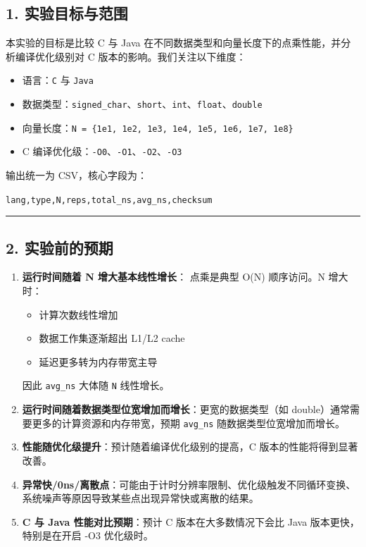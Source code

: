 \documentclass[12pt,fontset=none]{ctexart}
\providecommand{\tightlist}{%
  \setlength{\itemsep}{0pt}\setlength{\parskip}{0pt}}
\begin{document}
\subsection{1.
实验目标与范围}\label{1-ux5b9eux9a8cux76eeux6807ux4e0eux8303ux56f4}

本实验的目标是比较 C 与 Java
在不同数据类型和向量长度下的点乘性能，并分析编译优化级别对 C
版本的影响。我们关注以下维度：

\begin{itemize}
\tightlist
\item
  语言：\texttt{C} 与 \texttt{Java}
\item
  数据类型：\texttt{signed\_char}、\texttt{short}、\texttt{int}、\texttt{float}、\texttt{double}
\item
  向量长度：\texttt{N\ =\ \{1e1,\ 1e2,\ 1e3,\ 1e4,\ 1e5,\ 1e6,\ 1e7,\ 1e8\}}
\item
  C 编译优化级：\texttt{-O0}、\texttt{-O1}、\texttt{-O2}、\texttt{-O3}
\end{itemize}

输出统一为 CSV，核心字段为：

\texttt{lang,type,N,reps,total\_ns,avg\_ns,checksum}

\begin{center}\rule{0.5\linewidth}{0.5pt}\end{center}

\subsection{2.
实验前的预期}\label{2-ux5b9eux9a8cux524dux7684ux9884ux671f}

\begin{enumerate}
\def\labelenumi{\arabic{enumi}.}
\item
  \textbf{运行时间随着 N 增大基本线性增长}： 点乘是典型 O(N) 顺序访问。N
  增大时：

  \begin{itemize}
  \tightlist
  \item
    计算次数线性增加
  \item
    数据工作集逐渐超出 L1/L2 cache
  \item
    延迟更多转为内存带宽主导
  \end{itemize}

  因此 \texttt{avg\_ns} 大体随 \texttt{N} 线性增长。
\item
  \textbf{运行时间随着数据类型位宽增加而增长}：更宽的数据类型（如
  double）通常需要更多的计算资源和内存带宽，预期 \texttt{avg\_ns}
  随数据类型位宽增加而增长。
\item
  \textbf{性能随优化级提升}：预计随着编译优化级别的提高，C
  版本的性能将得到显著改善。
\item
  \textbf{异常快/0ns/离散点}：可能由于计时分辨率限制、优化级触发不同循环变换、系统噪声等原因导致某些点出现异常快或离散的结果。
\item
  \textbf{C 与 Java 性能对比预期}：预计 C 版本在大多数情况下会比 Java
  版本更快，特别是在开启 -O3 优化级时。
\end{enumerate}
\end{document}

